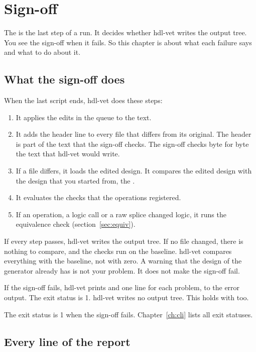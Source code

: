 \chapter{Sign-off}
\label{ch:signoff}

The  is the last step of a run. It decides whether hdl-vet writes the
output tree. You see the sign-off when it fails. So this chapter is about what each
failure says and what to do about it.

\section{What the sign-off does}

When the last script ends, hdl-vet does these steps:

\begin{enumerate}
\item It applies the edits in the queue to the text.
\item It adds the header line  to every file
  that differs from its original. The header is part of the text that the sign-off
  checks. The sign-off checks byte for byte the text that hdl-vet would write.
\item If a file differs, it loads the edited design. It compares the edited design with
  the design that you started from, the .
\item It evaluates the checks that the operations registered.
\item If an operation, a logic call or a raw splice changed logic, it runs the equivalence check
  (section~\ref{sec:equiv}).
\end{enumerate}

If every step passes, hdl-vet writes the output tree. If no file changed, there is
nothing to compare, and the checks run on the baseline. hdl-vet compares everything
with the baseline, not with zero. A warning that the design of the generator
already has is not your problem. It does not make the sign-off fail.

If the sign-off fails, hdl-vet prints  and one line for
each problem, to the error output. The exit status is 1. hdl-vet writes no output tree.
This holds with  too.

The exit status is 1 when the sign-off fails. Chapter~\ref{ch:cli} lists all exit statuses.

\section{Every line of the report}

